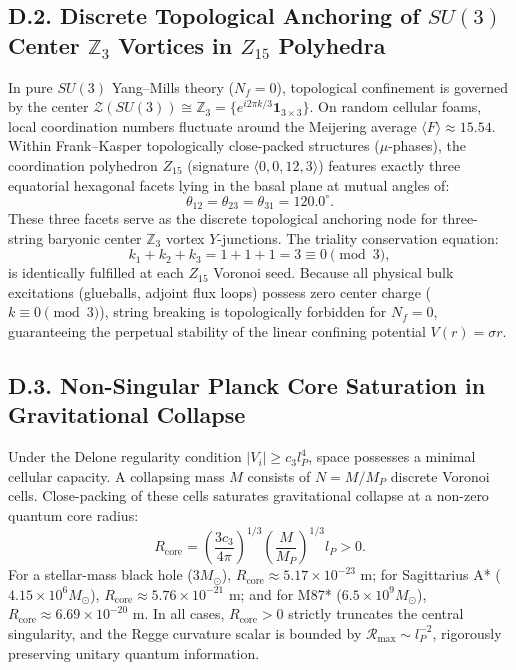\subsection*{D.2. Discrete Topological Anchoring of $SU(3)$ Center $\mathbb{Z}_3$ Vortices in $Z_{15}$ Polyhedra}
In pure $SU(3)$ Yang--Mills theory ($N_f = 0$), topological confinement is governed by the center $\mathcal{Z}(SU(3)) \cong \mathbb{Z}_3 = \{e^{i 2\pi k/3}\mathbf{1}_{3\times 3}\}$. On random cellular foams, local coordination numbers fluctuate around the Meijering average $\langle F \rangle \approx 15.54$. Within Frank--Kasper topologically close-packed structures ($\mu$-phases), the coordination polyhedron $Z_{15}$ (signature $\langle 0, 0, 12, 3 \rangle$) features exactly three equatorial hexagonal facets lying in the basal plane at mutual angles of:
\begin{equation}\label{eq:D.4}\tag{D.4}
\theta_{12} = \theta_{23} = \theta_{31} = 120.0^\circ.
\end{equation}
These three facets serve as the discrete topological anchoring node for three-string baryonic center $\mathbb{Z}_3$ vortex $Y$-junctions. The triality conservation equation:
\begin{equation}\label{eq:D.5}\tag{D.5}
k_1 + k_2 + k_3 = 1 + 1 + 1 = 3 \equiv 0 \pmod 3,
\end{equation}
is identically fulfilled at each $Z_{15}$ Voronoi seed. Because all physical bulk excitations (glueballs, adjoint flux loops) possess zero center charge ($k \equiv 0 \pmod 3$), string breaking is topologically forbidden for $N_f = 0$, guaranteeing the perpetual stability of the linear confining potential $V(r) = \sigma r$.

\subsection*{D.3. Non-Singular Planck Core Saturation in Gravitational Collapse}
Under the Delone regularity condition $|V_i| \ge c_3 l_P^4$, space possesses a minimal cellular capacity. A collapsing mass $M$ consists of $N = M / M_P$ discrete Voronoi cells. Close-packing of these cells saturates gravitational collapse at a non-zero quantum core radius:
\begin{equation}\label{eq:D.6}\tag{D.6}
R_{\text{core}} = \left( \frac{3 c_3}{4\pi} \right)^{1/3} \left( \frac{M}{M_P} \right)^{1/3} l_P > 0.
\end{equation}
For a stellar-mass black hole ($3 M_\odot$), $R_{\text{core}} \approx 5.17 \times 10^{-23}\text{ m}$; for Sagittarius A* ($4.15 \times 10^6 M_\odot$), $R_{\text{core}} \approx 5.76 \times 10^{-21}\text{ m}$; and for M87* ($6.5 \times 10^9 M_\odot$), $R_{\text{core}} \approx 6.69 \times 10^{-20}\text{ m}$. In all cases, $R_{\text{core}} > 0$ strictly truncates the central singularity, and the Regge curvature scalar is bounded by $\mathcal{R}_{\max} \sim l_P^{-2}$, rigorously preserving unitary quantum information.

